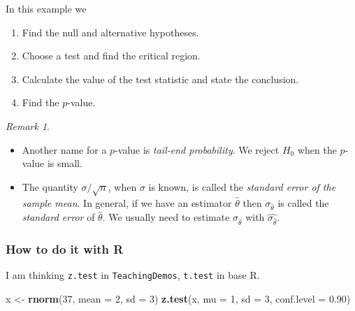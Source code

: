 \documentclass[]{book}
\newenvironment{Shaded}{\begin{snugshade}}{\end{snugshade}}
\newcommand{\KeywordTok}[1]{\textcolor[rgb]{0.13,0.29,0.53}{\textbf{{#1}}}}
\newcommand{\DataTypeTok}[1]{\textcolor[rgb]{0.13,0.29,0.53}{{#1}}}
\newcommand{\DecValTok}[1]{\textcolor[rgb]{0.00,0.00,0.81}{{#1}}}
\newcommand{\FloatTok}[1]{\textcolor[rgb]{0.00,0.00,0.81}{{#1}}}
\newcommand{\StringTok}[1]{\textcolor[rgb]{0.31,0.60,0.02}{{#1}}}
\newcommand{\NormalTok}[1]{{#1}}
\providecommand{\tightlist}{%
  \setlength{\itemsep}{0pt}\setlength{\parskip}{0pt}}
\numberwithin{equation}{chapter}
\numberwithin{figure}{chapter}
\theoremstyle{plain}
\theoremstyle{definition}
\theoremstyle{remark}
\theoremstyle{definition}
\theoremstyle{definition}
\theoremstyle{remark}
\newtheorem*{remark}{Remark}
\let\BeginKnitrBlock\begin \let\EndKnitrBlock\end
\begin{document}
\BeginKnitrBlock{example}
\protect\hypertarget{ex:unnamed-chunk-394}{}{\label{ex:unnamed-chunk-394}}In
this example we

\begin{enumerate}
\def\labelenumi{\arabic{enumi}.}
\tightlist
\item
  Find the null and alternative hypotheses.
\item
  Choose a test and find the critical region.
\item
  Calculate the value of the test statistic and state the conclusion.
\item
  Find the \(p\)-value.
\end{enumerate}
\EndKnitrBlock{example}

\begin{remark}
\begin{itemize}
\tightlist
\item
  Another name for a \(p\)-value is \emph{tail-end probability}. We
  reject \(H_{0}\) when the \(p\)-value is small.
\item
  The quantity \(\sigma/\sqrt{n}\), when \(\sigma\) is known, is called
  the \emph{standard error of the sample mean}. In general, if we have
  an estimator \(\hat{\theta}\) then \(\sigma_{\hat{\theta}}\) is called
  the \emph{standard error} of \(\hat{\theta}\). We usually need to
  estimate \(\sigma_{\hat{\theta}}\) with
  \(\hat{\sigma_{\hat{\theta}}}\).
\end{itemize}
\end{remark}

\subsubsection{How to do it with R}\label{how-to-do-it-with-r-40}

I am thinking \texttt{z.test}  in
\texttt{TeachingDemos}, \texttt{t.test} 
in base R.

\begin{Shaded}
\begin{Highlighting}[]
\NormalTok{x <-}\StringTok{ }\KeywordTok{rnorm}\NormalTok{(}\DecValTok{37}\NormalTok{, }\DataTypeTok{mean =} \DecValTok{2}\NormalTok{, }\DataTypeTok{sd =} \DecValTok{3}\NormalTok{)}
\KeywordTok{z.test}\NormalTok{(x, }\DataTypeTok{mu =} \DecValTok{1}\NormalTok{, }\DataTypeTok{sd =} \DecValTok{3}\NormalTok{, }\DataTypeTok{conf.level =} \FloatTok{0.90}\NormalTok{)}
\end{Highlighting}
\end{Shaded}
\end{document}
